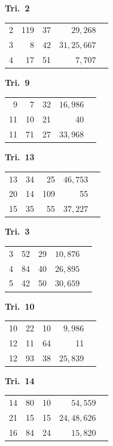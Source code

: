 \documentclass[12pt,a4paper]{article}
\theoremstyle{plain}
\theoremstyle{definition}
\theoremstyle{remark}
\begin{document}
\begin{center}
\medskip
\noindent
\begin{minipage}[t]{0.32\textwidth}
\centering
\textbf{Tri.~2}
\begin{tabular}[t]{r|r|r|r|l}
  2 & 119 & 37 & $29{,}268$ \\
  3 & 8 & 42 & $31{,}25{,}667$ \\
  4 & 17 & 51 & $7{,}707$ \\
\end{tabular}
\end{minipage}\hfill
\begin{minipage}[t]{0.32\textwidth}
\centering
\textbf{Tri.~9}
\begin{tabular}[t]{r|r|r|r|l}
  9 & 7 & 32 & $16{,}986$ \\
  11 & 10 & 21 & 40 \\
  11 & 71 & 27 & $33{,}968$ \\
\end{tabular}
\end{minipage}\hfill
\begin{minipage}[t]{0.32\textwidth}
\centering
\textbf{Tri.~13}
\begin{tabular}[t]{r|r|r|r|l}
  13 & 34 & 25 & $46{,}753$ \\
  20 & 14 & 109 & 55 \\
  15 & 35 & 55 & $37{,}227$ \\
\end{tabular}
\end{minipage}

\medskip
\noindent
\begin{minipage}[t]{0.32\textwidth}
\centering
\textbf{Tri.~3}
\begin{tabular}[t]{r|r|r|r|l}
  3 & 52 & 29 & $10{,}876$ \\
  4 & 84 & 40 & $26{,}895$ \\
  5 & 42 & 50 & $30{,}659$ \\
\end{tabular}
\end{minipage}\hfill
\begin{minipage}[t]{0.32\textwidth}
\centering
\textbf{Tri.~10}
\begin{tabular}[t]{r|r|r|r|l}
  10 & 22 & 10 & $9{,}986$ \\
  12 & 11 & 64 & 11 \\
  12 & 93 & 38 & $25{,}839$ \\
\end{tabular}
\end{minipage}\hfill
\begin{minipage}[t]{0.32\textwidth}
\centering
\textbf{Tri.~14}
\begin{tabular}[t]{r|r|r|r|l}
  14 & 80 & 10 & $54{,}559$ \\
  21 & 15 & 15 & $24{,}48{,}626$ \\
  16 & 84 & 24 & $15{,}820$ \\
\end{tabular}
\end{minipage}


\end{center}
\end{document}
